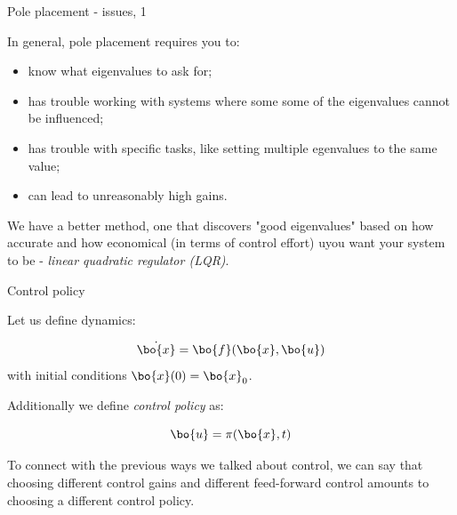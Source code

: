 \documentclass{beamer}
\begin{document}
\begin{frame}{Pole placement - issues, 1}
	\begin{flushleft}
		
		In general, pole placement requires you to:
		
		\begin{itemize}
			\item know what eigenvalues to ask for;
			
			\item has trouble working with systems where some some of the eigenvalues cannot be influenced;
			
			\item has trouble with specific tasks, like setting multiple egenvalues to the same value;
			
			\item can lead to unreasonably high gains.
		\end{itemize}
		
		We have a better method, one that discovers "good eigenvalues" based on how accurate and how economical (in terms of control effort) uyou want your system to be - \emph{linear quadratic regulator (LQR)}.
		
	\end{flushleft}
\end{frame}


\begin{frame}{Control policy}
\begin{flushleft}

Let us define dynamics:

\begin{equation}
    \dot {\bo{x}} = \bo{f} (\bo{x}, \bo{u})
\end{equation}
%
with initial conditions $\bo{x}(0)=\bo{x}_0$. 

\bigskip

Additionally we define \emph{control policy} as:

\begin{equation}
    \bo{u} = \pi (\bo{x}, t)
\end{equation}

To connect with the previous ways we talked about control, we can say that choosing different control gains and different feed-forward control amounts to choosing a different control policy.

\end{flushleft}
\end{frame}
\end{document}
